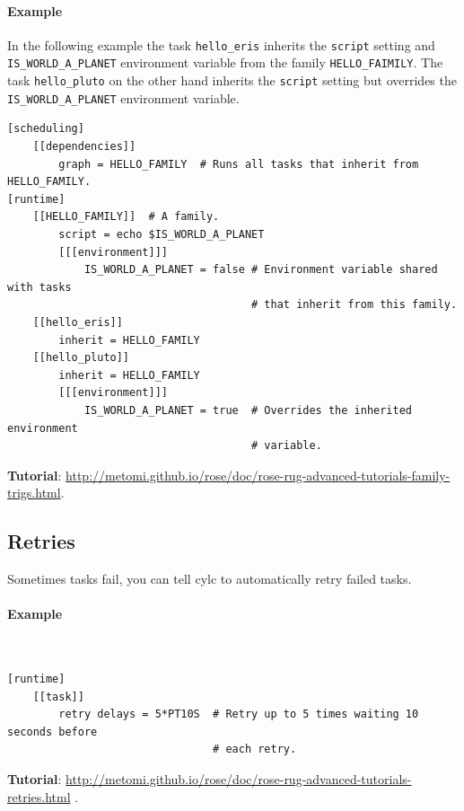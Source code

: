 \paragraph*{Example}
In the following example the
task \lstinline{hello_eris} inherits the \lstinline{script} setting and
\lstinline{IS_WORLD_A_PLANET} environment variable from the family
\lstinline{HELLO_FAIMILY}. The task \lstinline{hello_pluto} on the other hand
inherits the \lstinline{script} setting but overrides the
\lstinline{IS_WORLD_A_PLANET} environment variable.

\begin{lstlisting}
[scheduling]
    [[dependencies]]
        graph = HELLO_FAMILY  # Runs all tasks that inherit from HELLO_FAMILY.
[runtime]
    [[HELLO_FAMILY]]  # A family.
        script = echo $IS_WORLD_A_PLANET
        [[[environment]]]
            IS_WORLD_A_PLANET = false # Environment variable shared with tasks
                                      # that inherit from this family.
    [[hello_eris]]
        inherit = HELLO_FAMILY
    [[hello_pluto]]
        inherit = HELLO_FAMILY
        [[[environment]]]
            IS_WORLD_A_PLANET = true  # Overrides the inherited environment
                                      # variable.
\end{lstlisting}

\begin{shaded*}
\textbf{Tutorial}: \url{http://metomi.github.io/rose/doc/rose-rug-advanced-tutorials-family-trigs.html}.
\end{shaded*}


\subsection{Retries}
Sometimes tasks fail, you can tell cylc to automatically retry failed tasks.

\paragraph*{Example} $ $

\begin{lstlisting}
[runtime]
    [[task]]
        retry delays = 5*PT10S  # Retry up to 5 times waiting 10 seconds before
                                # each retry.
\end{lstlisting}

\begin{shaded*}
\textbf{Tutorial}: \url{http://metomi.github.io/rose/doc/rose-rug-advanced-tutorials-retries.html}
.
\end{shaded*}


